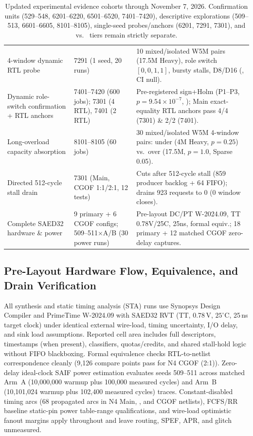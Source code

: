 \begin{table}[t]
\begin{tabular}{@{}P{.27\textwidth}P{.22\textwidth}P{.47\textwidth}@{}}
4-window dynamic RTL probe & 7291 (1 seed, 20 runs) & 10 mixed/isolated W5M pairs (17.5M Heavy), role switch $[0,0,1,1]$, bursty stalls, D8/D16 (, CI null). \\
Dynamic role-switch confirmation + RTL anchors & 7401--7420 (600  jobs); 7301 (4 RTL), 7401 (2 RTL) & Pre-registered sign+Holm (P1--P3, $p=9.54\times 10^{-7}$, ); Main exact-equality RTL anchors pass 4/4 (7301) \& 2/2 (7401). \\
Long-overload capacity absorption & 8101--8105 (60  jobs) & 30 mixed/isolated W5M 4-window pairs: under (4M Heavy, $p=0.25$) vs.\ over (17.5M, $p=1.0$, Sparse 0.05). \\
Directed 512-cycle stall drain & 7301 (Main, CGOF 1:1/2:1, 12 tests) & Cuts after 512-cycle  stall (859 producer backlog + 64 FIFO); drains 923 requests to 0 (0 window closes). \\
Complete SAED32 hardware \& power & 9 primary + 6 CGOF configs; 509--511$\times$A/B (30 power runs) & Pre-layout DC/PT W-2024.09, TT 0.78V/25C, 25ns, formal equiv.; 18 primary + 12 matched CGOF zero-delay captures. \\
\bottomrule
\end{tabular}
\caption{Updated experimental evidence cohorts through November 7, 2026. Confirmation units (529--548, 6201--6220, 6501--6520, 7401--7420), descriptive explorations (509--513, 6601--6605, 8101--8105), single-seed probes/anchors (6201, 7291, 7301), and  vs.\  tiers remain strictly separate.}
\label{tab:cohorts}
\end{table}

\subsection{Pre-Layout Hardware Flow, Equivalence, and Drain Verification}
All synthesis and static timing analysis (STA) runs use Synopsys Design Compiler and PrimeTime W-2024.09 with SAED32 RVT (TT, 0.78\,V, $25^{\circ}$C, 25\,ns target clock) under identical external wire-load, timing uncertainty, I/O delay, and sink load assumptions. Reported cell area includes full descriptors, timestamps (when present), classifiers, quotas/credits, and shared stall-hold logic without FIFO blackboxing. Formal equivalence checks RTL-to-netlist correspondence cleanly (9,126 compare points pass for N4 CGOF (2:1)). Zero-delay ideal-clock SAIF power estimation evaluates seeds 509--511 across matched Arm~A (10,000,000 warmup plus 100,000 measured cycles) and Arm~B (10,101,024 warmup plus 102,400 measured cycles) traces. Constant-disabled  timing arcs (68 propagated arcs in N4 Main, \Alg{}, and CGOF netlists), FCFS/RR baseline static-pin power table-range qualifications, and wire-load optimistic fanout margins apply throughout and leave routing, SPEF, APR, and glitch unmeasured.


